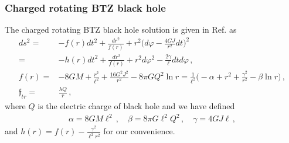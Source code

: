 \documentclass[11pt]{article}
\newcommand{\vap}{\varphi}
\numberwithin{equation}{section}
\begin{document}
\subsubsection{Charged rotating BTZ black hole}
\label{sec:charged-rotating-btz-1}

The charged rotating BTZ black hole solution is given in Ref.\cite{Martinez:1999qi}
as
\begin{align}
  ds^2 =& -f(r) dt^2 + \frac{dr^2}{f(r)} + r^2 \bigg( d\varphi - \frac{4G J}{r^2} dt \bigg)^2
\\=&
-h(r) dt^2 + \frac{dr^2}{f(r)} + r^2 d\vap^2
-\frac{2\gamma}{\ell} dtd\vap
 \,,
\label{eq:crBTZ_sol}
\\
f(r)=&
  -8G M +\frac{r^2}{\ell^2} + \frac{16 G^2 J^2}{r^2} - 8 \pi {G} Q^2 \ln r
=
\frac{1}{\ell^2} \bigg(-\alpha + r^2 + \frac{\gamma^2}{r^2} - \beta \ln r \bigg)
 \,,
\label{eq:f_CRBTZ}
\\
\mathfrak{f}_{tr} =& \frac{\lambda Q}{r} \,,
\label{eq:U1_flux}
\end{align}
where $Q$ is the electric charge of black hole
and we have defined
\begin{align}
\alpha= 8G M \ell^2 \,,
\quad
\beta= 8\pi G \ell^2 Q^2 \,,
\quad
\gamma= 4 G J \ell \,,
\end{align}
and $h(r)=f(r)-\frac{\gamma^2}{\ell^2 r^2}$ for our convenience.
\end{document}
